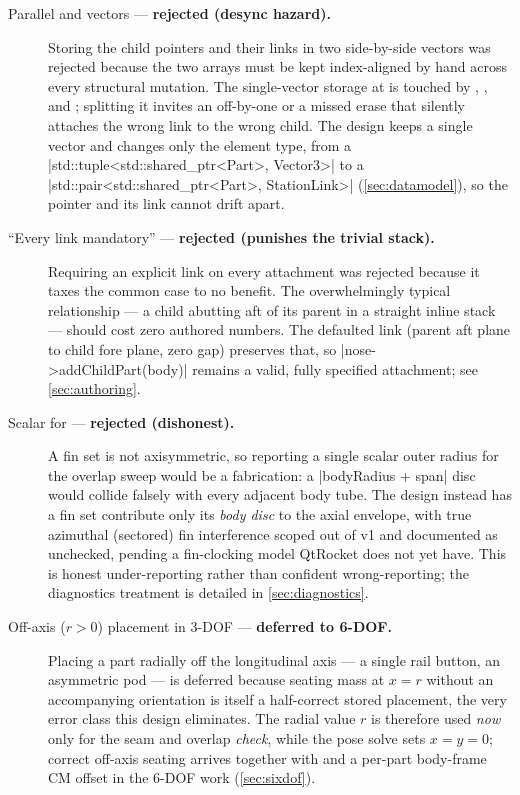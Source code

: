 \begin{description}
  \item[Parallel  and  vectors --- \textbf{rejected
  (desync hazard).}] Storing the child pointers and their links in two side-by-side vectors
  was rejected because the two arrays must be kept index-aligned by hand across every
  structural mutation. The single-vector storage at  is
  touched by , , and ; splitting it
  invites an off-by-one or a missed erase that silently attaches the wrong link to the
  wrong child. The design keeps a single vector and changes only the element type, from a
  \cppinline|std::tuple<std::shared_ptr<Part>, Vector3>| to a
  \cppinline|std::pair<std::shared_ptr<Part>, StationLink>| (\cref{sec:datamodel}), so the
  pointer and its link cannot drift apart.

  \item[``Every link mandatory'' --- \textbf{rejected (punishes the trivial stack).}]
  Requiring an explicit link on every attachment was rejected because it taxes the common
  case to no benefit. The overwhelmingly typical relationship --- a child abutting aft of
  its parent in a straight inline stack --- should cost zero authored numbers. The
  defaulted  link (parent aft plane to child fore plane, zero gap) preserves
  that, so \cppinline|nose->addChildPart(body)| remains a valid, fully specified
  attachment; see \cref{sec:authoring}.

  \item[Scalar  for  --- \textbf{rejected (dishonest).}]
  A fin set is not axisymmetric, so reporting a single scalar outer radius for the overlap
  sweep would be a fabrication: a \cppinline|bodyRadius + span| disc would collide falsely
  with every adjacent body tube. The design instead has a fin set contribute only its
  \emph{body disc} to the axial envelope, with true azimuthal (sectored) fin interference
  scoped out of v1 and documented as unchecked, pending a fin-clocking model QtRocket does
  not yet have. This is honest under-reporting rather than confident wrong-reporting; the
  diagnostics treatment is detailed in \cref{sec:diagnostics}.

  \item[Off-axis ($r > 0$) placement in 3-DOF --- \textbf{deferred to 6-DOF.}] Placing a
  part radially off the longitudinal axis --- a single rail button, an asymmetric pod --- is
  deferred because seating mass at $x = r$ without an accompanying orientation is itself a
  half-correct stored placement, the very error class this design eliminates. The radial
  value $r$ is therefore used \emph{now} only for the seam and overlap \emph{check}, while
  the pose solve sets $x = y = 0$; correct off-axis seating arrives together with
   and a per-part body-frame CM offset in the 6-DOF work (\cref{sec:sixdof}).

\end{description}

